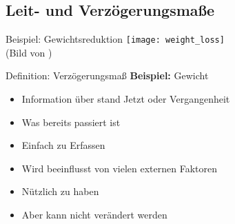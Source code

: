 %
%
%
%
%
%




\subsection{Leit- und Verzögerungsmaße}


\begin{frame}[c]{Beispiel: Gewichtsreduktion}
    \texttt{[image: weight\_loss]} \\
    (Bild von \cite{weight-loss-pic})
\end{frame}

\begin{frame}[c]{Definition: Verzögerungsmaß}
    \large
    \pause
    \textbf{Beispiel:} Gewicht
    \begin{itemize}[<+(1)->]
        \item Information über stand Jetzt oder Vergangenheit
        \item Was bereits passiert ist
        \item Einfach zu Erfassen
        \item Wird beeinflusst von vielen externen Faktoren
        \item Nützlich zu haben
        \item Aber kann nicht verändert werden
    \end{itemize}
\end{frame}


